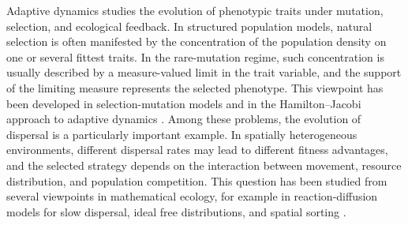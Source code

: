 \documentclass[11pt]{article}
\begin{document}
Adaptive dynamics studies the evolution of phenotypic traits under mutation, selection, and ecological feedback. In structured population models, natural selection is often manifested by the concentration of the population density on one or several fittest traits. In the rare-mutation regime, such concentration is usually described by a measure-valued limit in the trait variable, and the support of the limiting measure represents the selected phenotype. This viewpoint has been developed in selection-mutation models and in the Hamilton--Jacobi approach to adaptive dynamics \cite{BarlesPerthame, DiekmannJabinMischlerPerthame}. Among these problems, the evolution of dispersal is a particularly important example. In spatially heterogeneous environments, different dispersal rates may lead to different fitness advantages, and the selected strategy depends on the interaction between movement, resource distribution, and population competition. This question has been studied from several viewpoints in mathematical ecology, for example in reaction-diffusion models for slow dispersal, ideal free distributions, and spatial sorting \cite{DockeryHutsonMischaikowPernarowski1998, Hastings1983,Ronce2007}.
\end{document}
